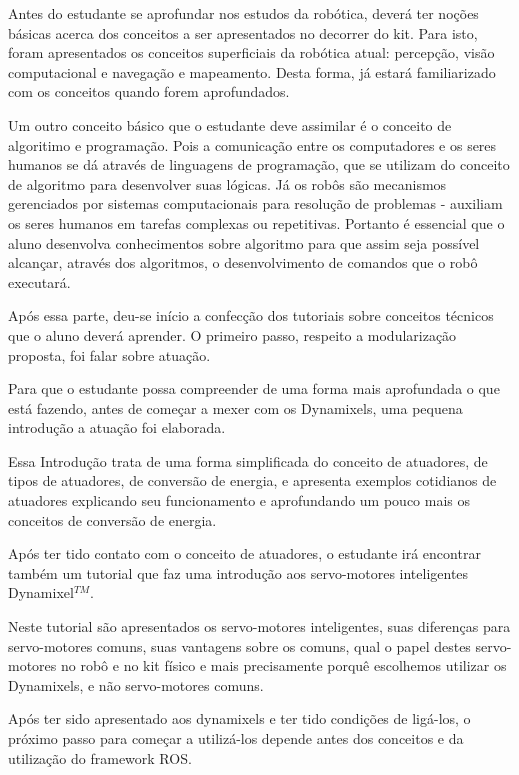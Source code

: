 Antes do estudante se aprofundar nos estudos da robótica, deverá ter noções básicas acerca dos conceitos a ser apresentados no decorrer do kit. Para isto, foram apresentados os conceitos superficiais da robótica atual: percepção, visão computacional e navegação e mapeamento. Desta forma, já estará familiarizado com os conceitos quando forem aprofundados.

Um outro conceito básico que o estudante deve assimilar é o conceito de algoritimo e programação. Pois a comunicação entre os computadores e os seres humanos se dá através de linguagens de programação, que se utilizam do conceito de algoritmo para desenvolver suas lógicas. Já os robôs são mecanismos gerenciados por sistemas computacionais para resolução de problemas - auxiliam os seres humanos em tarefas complexas ou repetitivas. Portanto é essencial que o aluno desenvolva conhecimentos sobre algoritmo para que assim seja possível alcançar, através dos algoritmos, o desenvolvimento de comandos que o robô executará.

Após essa parte, deu-se início a confecção dos tutoriais sobre conceitos técnicos que o aluno deverá aprender. O primeiro passo, respeito a modularização proposta, foi falar sobre atuação.

Para que o estudante possa compreender de uma forma mais aprofundada o que está fazendo, antes de começar a mexer com os Dynamixels, uma pequena introdução a atuação foi elaborada.

Essa Introdução trata de uma forma simplificada do conceito de atuadores, de tipos de atuadores, de conversão de energia, e apresenta exemplos cotidianos de atuadores explicando seu funcionamento e aprofundando um pouco mais os conceitos de conversão de energia. \cite{tutAtua}

Após ter tido contato com o conceito de atuadores, o estudante irá encontrar também um tutorial que faz uma introdução aos servo-motores inteligentes Dynamixel$^{TM}$.

Neste tutorial são apresentados os servo-motores inteligentes, suas diferenças para servo-motores comuns, suas vantagens sobre os comuns, qual o papel destes servo-motores no robô e no kit físico e mais precisamente porquê escolhemos utilizar os Dynamixels, e não servo-motores comuns. \cite{tutDyna}

Após ter sido apresentado aos dynamixels e ter tido condições de ligá-los, o próximo passo para começar a utilizá-los depende antes dos conceitos e da utilização do framework ROS.

